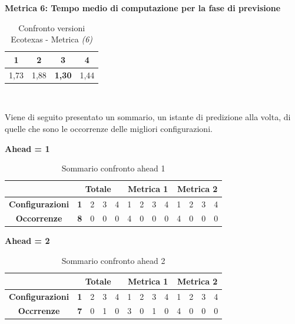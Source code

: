 \documentclass[12pt,a4paper,oneside,openright]{book}
\begin{document}
\medskip

\textbf{Metrica 6: Tempo medio di computazione per la fase di previsione}

\medskip

\begin{table}[H]
\centering
\begin{tabular}[H]{|c|c|c|c|}
\hline
1 & 2 & 3 & 4\\
\hline
1,73 & 1,88 & \textbf{1,30} & 1,44\\ 
\hline
\end{tabular} \\
\caption{Confronto versioni Ecotexas - Metrica \textit{(6)}}
\end{table}

Viene di seguito presentato un sommario, un istante di predizione alla volta, di quelle che sono le occorrenze delle migliori configurazioni.

\medskip

\medskip
\textbf{Ahead = 1}


\begin{table}[H]
\centering
\begin{tabular}{|c|c|c|c|c|c|c|c|c|c|c|c|c|}
\hline
 & \multicolumn{4}{|c|}{\textbf{Totale}} & \multicolumn{4}{|c|}{\textbf{Metrica 1}} & \multicolumn{4}{|c|}{\textbf{Metrica 2}} \\
\hline
\textbf{Configurazioni} & \textbf{1} & 2 & 3 & 4 & 1 & 2 & 3 & 4 & 1 & 2 & 3 & 4 \\
\hline
\textbf{Occorrenze} & \textbf{8} & 0 & 0 & 0 & 4 & 0 & 0 & 0 & 4 & 0 & 0 & 0\\
\hline
\end{tabular}
\caption{Sommario confronto ahead 1}
\end{table}

\medskip
\textbf{Ahead = 2}


\begin{table}[H]
\centering
\begin{tabular}{|c|c|c|c|c|c|c|c|c|c|c|c|c|}
\hline
 & \multicolumn{4}{|c|}{\textbf{Totale}} & \multicolumn{4}{|c|}{\textbf{Metrica 1}} & \multicolumn{4}{|c|}{\textbf{Metrica 2}} \\
\hline
\textbf{Configurazioni} & \textbf{1} & 2 & 3 & 4 & 1 & 2 & 3 & 4 & 1 & 2 & 3 & 4 \\
\hline
\textbf{Occrrenze} & \textbf{7} & 0 & 1 & 0 & 3 & 0 & 1 & 0 & 4 & 0 & 0 & 0 \\
\hline
\end{tabular}
\caption{Sommario confronto ahead 2}
\end{table}
\end{document}
